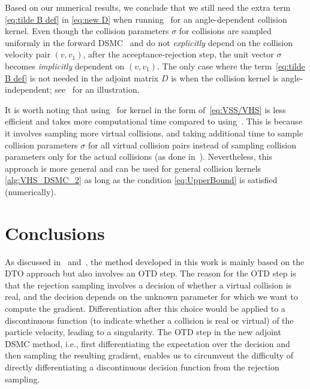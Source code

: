 \documentclass[12pt,nopreprintline]{elsarticle}
\begin{document}
Based on our numerical results, we conclude that we still need the extra term \eqref{eq:tilde B def} in \eqref{eq:new D} when running~ for an angle-dependent collision kernel. Even though the collision parameters $\sigma$ for collisions are sampled uniformly in the forward DSMC~ and do not \textit{explicitly} depend on the collision velocity pair $(v,v_1)$, after the acceptance-rejection step, the unit vector $\sigma$ becomes \textit{implicitly} dependent on $(v,v_1)$. The only case where the term~\eqref{eq:tilde B def} is not needed in the adjoint matrix $D$ is when the collision kernel is angle-independent; see~ for an illustration. 

It is worth noting that using~ for kernel in the form of~\eqref{eq:VSS/VHS} is less efficient and takes more computational time compared to using~. This is because it involves sampling more virtual collisions, and taking additional time to sample collision parameters $\sigma$ for all virtual collision pairs instead of sampling collision parameters only for the actual collisions (as done in~). Nevertheless, this approach is more general and can be used for general collision kernels \eqref{alg:VHS_DSMC_2} as long as the condition \eqref{eq:UpperBound} is satisfied (numerically). 
 
 

\section{Conclusions}\label{sec:conclusion}

As discussed in~ and~, the method developed in this work is mainly based on the DTO approach but also involves an OTD step. The reason for the OTD step is that the rejection sampling involves a decision of whether a virtual collision is real, and the decision depends on the unknown parameter for which we want to compute the gradient. Differentiation after this choice would be applied to a discontinuous function (to indicate whether a collision is real or virtual) of the particle velocity, leading to a singularity. The OTD step in the new adjoint DSMC method, i.e., first differentiating the expectation over the decision and then sampling the resulting gradient, enables us to circumvent the difficulty of directly differentiating a discontinuous decision function from the rejection sampling. 
\end{document}

